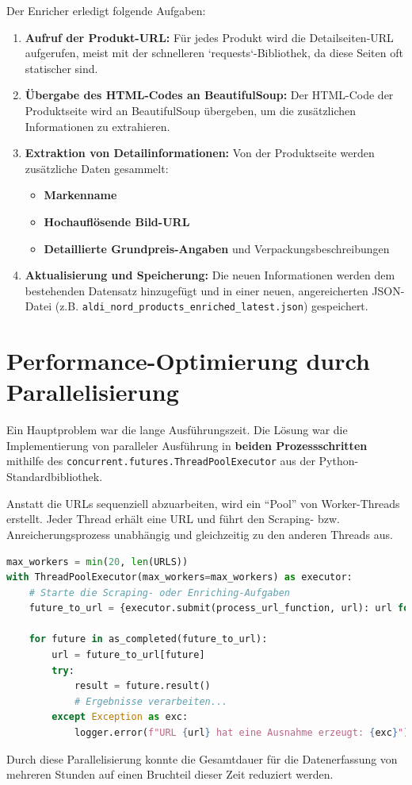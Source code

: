 \documentclass[12pt, a4paper]{report} %
\begin{document}
Der Enricher erledigt folgende Aufgaben:
\begin{enumerate}
    \item \textbf{Aufruf der Produkt-URL:} Für jedes Produkt wird die Detailseiten-URL aufgerufen, meist mit der schnelleren `requests`-Bibliothek, da diese Seiten oft statischer sind.
    \item \textbf{Übergabe des HTML-Codes an BeautifulSoup:} Der HTML-Code der Produktseite wird an BeautifulSoup übergeben, um die zusätzlichen Informationen zu extrahieren.
    \item \textbf{Extraktion von Detailinformationen:} Von der Produktseite werden zusätzliche Daten gesammelt:
        \begin{itemize}
            \item \textbf{Markenname}
            \item \textbf{Hochauflösende Bild-URL}
            \item \textbf{Detaillierte Grundpreis-Angaben} und Verpackungsbeschreibungen
        \end{itemize}
    \item \textbf{Aktualisierung und Speicherung:} Die neuen Informationen werden dem bestehenden Datensatz hinzugefügt und in einer neuen, angereicherten JSON-Datei (z.B. \texttt{aldi\_nord\_products\_enriched\_latest.json}) gespeichert.
\end{enumerate}

\section{Performance-Optimierung durch Parallelisierung}
\label{sec:scraping_performance}
Ein Hauptproblem war die lange Ausführungszeit. Die Lösung war die Implementierung von paralleler Ausführung in \textbf{beiden Prozessschritten} mithilfe des \texttt{concurrent.futures.ThreadPoolExecutor} aus der Python-Standardbibliothek.

Anstatt die URLs sequenziell abzuarbeiten, wird ein "`Pool"' von Worker-Threads erstellt. Jeder Thread erhält eine URL und führt den Scraping- bzw. Anreicherungsprozess unabhängig und gleichzeitig zu den anderen Threads aus.

\begin{lstlisting}[language=Python, caption={Parallele Ausführung mit ThreadPoolExecutor}]
max_workers = min(20, len(URLS))
with ThreadPoolExecutor(max_workers=max_workers) as executor:
    # Starte die Scraping- oder Enriching-Aufgaben
    future_to_url = {executor.submit(process_url_function, url): url for url in URLS}
    
    for future in as_completed(future_to_url):
        url = future_to_url[future]
        try:
            result = future.result()
            # Ergebnisse verarbeiten...
        except Exception as exc:
            logger.error(f"URL {url} hat eine Ausnahme erzeugt: {exc}")
\end{lstlisting}
Durch diese Parallelisierung konnte die Gesamtdauer für die Datenerfassung von mehreren Stunden auf einen Bruchteil dieser Zeit reduziert werden.
\end{document}
